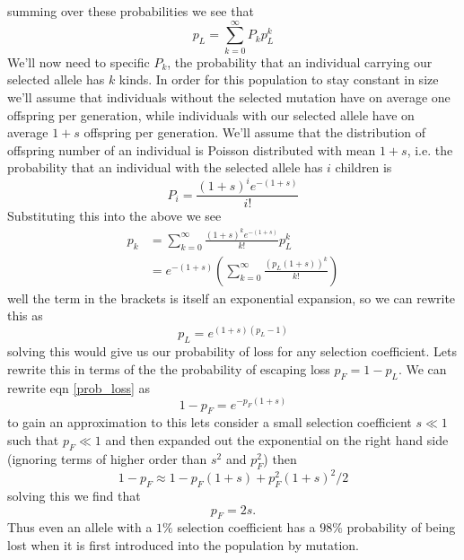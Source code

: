 summing over these probabilities we see that
\begin{equation}
  p_L = \sum_{k=0}^{\infty} P_k p_L^{k}
\end{equation}
We'll now need to specific $P_k$, the probability that an individual
carrying our selected allele has $k$ kinds. In order for this population to stay constant in size
we'll assume that individuals without the selected mutation have on average one
offspring per generation, while individuals with our selected allele
have on average $1+s$ offspring per generation. We'll assume that the
distribution of offspring number of an individual is Poisson
distributed with mean $1+s$, i.e. the probability that an individual
with the selected allele has $i$ children is
\begin{equation}
P_i= \frac{(1+s)^i e^{-(1+s)}}{i!}
\end{equation}
Substituting this into the above we see
  \begin{align}
p_k &=  \sum_{k=0}^{\infty} \frac{(1+s)^ke^{-(1+s)}}{k!} p_L^{k} \nonumber
\\
&= e^{-(1+s)} \left( \sum_{k=0}^{\infty} \frac{\left(p_L(1+s) \right)^k}{k!}  \right)
\end{align}
well the term in the brackets is itself an exponential expansion, so
we can rewrite this as
\begin{equation}
p_L = e^{(1+s)(p_L-1)} \label{prob_loss}
\end{equation}
solving this would give us our probability of loss for any selection
coefficient. Lets
rewrite this in terms of the the probability of escaping loss $p_F = 1-p_L$.  We can
rewrite eqn \eqref{prob_loss} as
\begin{equation}
1-p_F = e^{-p_F(1+s)}
\end{equation}
to gain an approximation to this lets consider a small selection
coefficient $s \ll 1$ such that $p_F \ll 1$ and then expanded out the
exponential on the right hand side (ignoring terms of higher
order than $s^2$ and $p_F^2$) then
\begin{equation}
1-p_F \approx 1-p_F(1+s)+p_F^2(1+s)^2/2
\end{equation}
solving this we find that
\begin{equation}
p_F = 2s.
\end{equation}
Thus even an allele with a $1\%$ selection coefficient has a $98\%$
probability of being lost when it is first introduced into the
population by mutation. \\



